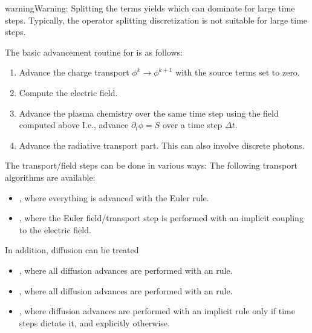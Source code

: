\documentclass[letterpaper,10pt,english]{sphinxmanual}
\begin{document}
\begin{sphinxadmonition}{warning}{Warning:}
\sphinxAtStartPar
Splitting the terms yields  which can dominate for large time steps.
Typically, the operator splitting discretization is not suitable for large time steps.
\end{sphinxadmonition}

\sphinxAtStartPar
The basic advancement routine for  is as follows:
\begin{enumerate}
%
\item {} 
\sphinxAtStartPar
Advance the charge transport \(\phi^k \rightarrow \phi^{k+1}\) with the source terms set to zero.

\item {} 
\sphinxAtStartPar
Compute the electric field.

\item {} 
\sphinxAtStartPar
Advance the plasma chemistry over the same time step using the field computed above
I.e., advance \(\partial_t\phi = S\) over a time step \(\Delta t\).

\item {} 
\sphinxAtStartPar
Advance the radiative transport part.
This can also involve discrete photons.

\end{enumerate}

\sphinxAtStartPar
The transport/field steps can be done in various ways:
The following transport algorithms are available:
\begin{itemize}
\item {} 
\sphinxAtStartPar
{}, where everything is advanced with the Euler rule.

\item {} 
\sphinxAtStartPar
{}, where the Euler field/transport step is performed with an implicit coupling to the electric field.

\end{itemize}

\sphinxAtStartPar
In addition, diffusion can be treated
\begin{itemize}
\item {} 
\sphinxAtStartPar
{}, where all diffusion advances are performed with an  rule.

\item {} 
\sphinxAtStartPar
{}, where all diffusion advances are performed with an  rule.

\item {} 
\sphinxAtStartPar
{}, where diffusion advances are performed with an implicit rule only if time steps dictate it, and explicitly otherwise.

\end{itemize}
\end{document}
